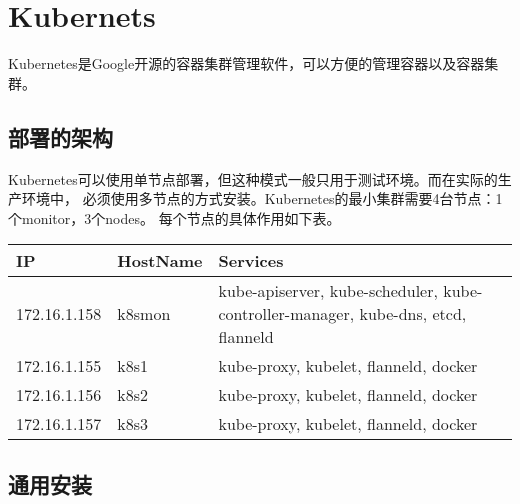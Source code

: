 \chapter{Kubernets}
Kubernetes是Google开源的容器集群管理软件，可以方便的管理容器以及容器集群。

\section{部署的架构}
Kubernetes可以使用单节点部署，但这种模式一般只用于测试环境。而在实际的生产环境中，
必须使用多节点的方式安装。Kubernetes的最小集群需要4台节点：1个monitor，3个nodes。
每个节点的具体作用如下表。
\begin{center}
  \begin{tabularx}{\textwidth}{|l|l|X|}
  \hline
  IP & HostName & Services\\ \hline
  172.16.1.158 & k8smon & kube-apiserver, kube-scheduler, kube-controller-manager, kube-dns, etcd, flanneld\\
  172.16.1.155 & k8s1 & kube-proxy, kubelet, flanneld, docker \\
  172.16.1.156 & k8s2 & kube-proxy, kubelet, flanneld, docker \\
  172.16.1.157 & k8s3 & kube-proxy, kubelet, flanneld, docker \\
  \hline
  \end{tabularx}
  \label{tab:URL Mapping}
\end{center}

\section{通用安装}


